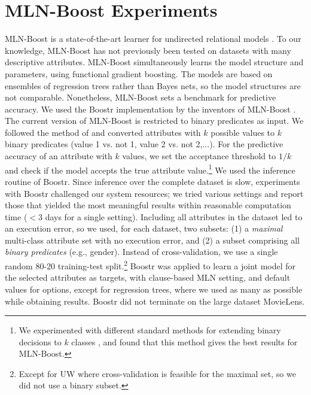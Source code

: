 \documentclass{article}
\begin{document}
\section{MLN-Boost Experiments} \label{sec:mln-boost}
MLN-Boost is a state-of-the-art learner for undirected relational models \cite{Khot2011}. To our knowledge, MLN-Boost has not previously been tested on datasets with many descriptive attributes. MLN-Boost simultaneously learns the model structure and parameters,  using functional gradient boosting. 
The models are based on ensembles of regression trees rather than Bayes nets, so the model structures are not comparable. Nonetheless, MLN-Boost sets a benchmark for predictive accuracy. We used the Boostr implementation by the inventors of MLN-Boost \cite{Khot2013}. The current version of MLN-Boost is restricted to binary predicates as input. We followed the method of \cite{Khot2011} and converted attributes with $k$ possible values to $k$ binary predicates (value 1 vs. not 1, value 2 vs. not 2,...). 
For the predictive accuracy of an attribute with $k$ values, 
we set the acceptance threshold to $1/k$ and check if the model accepts the true attribute value.\footnote{We experimented with different standard methods for extending binary decisions to $k$ classes \cite[Ch.7.1.3]{Bishop2006}, and found that this method gives the best results for MLN-Boost.} We used the inference routine of Boostr. Since inference over the complete dataset is slow, experiments with Boostr challenged our system resources; we tried various settings and report those that yielded the most meaningful results within reasonable computation time ($< 3$ days for a single setting). Including all attributes in the dataset led to an execution error, so we used, for each dataset, two subsets: (1) a {\em maximal} multi-class attribute set with no execution error, and (2) a subset comprising all {\em binary predicates} (e.g., gender). Instead of cross-validation, we use a single random 80-20 training-test split.\footnote{Except for UW where cross-validation is feasible for the maximal set, so we did not use a binary subset.} Boostr was applied to learn a joint model for the selected attributes as targets, with clause-based MLN setting, and default values for options, except for regression trees, where we used as many as possible while obtaining results. 
 Boostr did not terminate on the large dataset MovieLens.
\end{document}
